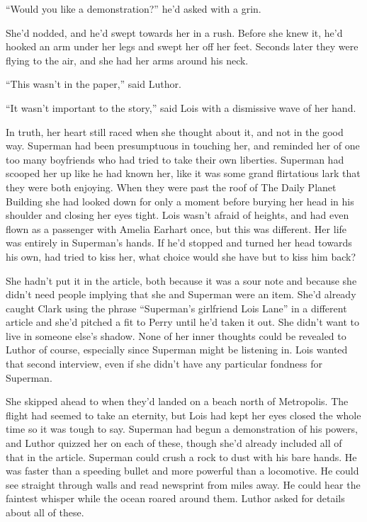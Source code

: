``Would you like a demonstration?'' he'd asked with a grin.

She'd nodded, and he'd swept towards her in a rush. Before she knew it,
he'd hooked an arm under her legs and swept her off her feet. Seconds
later they were flying to the air, and she had her arms around his neck.

``This wasn't in the paper,'' said Luthor.

``It wasn't important to the story,'' said Lois with a dismissive wave
of her hand.

In truth, her heart still raced when she thought about it, and not in
the good way. Superman had been presumptuous in touching her, and
reminded her of one too many boyfriends who had tried to take their own
liberties. Superman had scooped her up like he had known her, like it
was some grand flirtatious lark that they were both enjoying. When they
were past the roof of The Daily Planet Building she had looked down for
only a moment before burying her head in his shoulder and closing her
eyes tight. Lois wasn't afraid of heights, and had even flown as a
passenger with Amelia Earhart once, but this was different. Her life was
entirely in Superman's hands. If he'd stopped and turned her head
towards his own, had tried to kiss her, what choice would she have but
to kiss him back?

She hadn't put it in the article, both because it was a sour note and
because she didn't need people implying that she and Superman were an
item. She'd already caught Clark using the phrase ``Superman's
girlfriend Lois Lane'' in a different article and she'd pitched a fit to
Perry until he'd taken it out. She didn't want to live in someone else's
shadow. None of her inner thoughts could be revealed to Luthor of
course, especially since Superman might be listening in. Lois wanted
that second interview, even if she didn't have any particular fondness
for Superman.

She skipped ahead to when they'd landed on a beach north of Metropolis.
The flight had seemed to take an eternity, but Lois had kept her eyes
closed the whole time so it was tough to say. Superman had begun a
demonstration of his powers, and Luthor quizzed her on each of these,
though she'd already included all of that in the article. Superman could
crush a rock to dust with his bare hands. He was faster than a speeding
bullet and more powerful than a locomotive. He could see straight
through walls and read newsprint from miles away. He could hear the
faintest whisper while the ocean roared around them. Luthor asked for
details about all of these.

